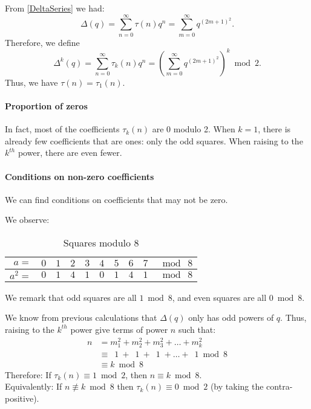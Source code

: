 From \ref{DeltaSeries} we had:
$$
\Delta(q) 
= \sum_{n=0}^{\infty} \tau(n)q^n
= \sum_{m=0}^{\infty} q^{(2m+1)^2}.
$$
Therefore, we define 
$$
\Delta^{k}(q) 
= \sum_{n=0}^{\infty} \tau_k(n)q^n
= \left( \sum_{m=0}^{\infty} q^{(2m+1)^2} \right)^k \bmod 2.
$$
Thus, we have $\tau(n)=\tau_1(n)$.

\paragraph{Proportion of zeros}
In fact, most of the coefficients $\tau_k(n)$ are $0$ modulo 2.
When $k=1$, there is already few coefficients that are ones: only the odd squares.
When raising to the $k^{th}$ power, there are even fewer.

\paragraph{Conditions on non-zero coefficients}
We can find conditions on coefficients that may not be zero.

We observe:
\begin{table}[!ht]

	\begin{center}
		\begin{tabular}{|r||c|c|c|c|c|c|c|c||l|}
			\hline
			$a=$ & $0$ & $1$ & $2$ & $3$ & $4$ & $5$ & $6$ & $7$ & $\bmod \ 8$ \\
			\hline
			$a^2=$ & \color{BrickRed} $0$ & \color{ForestGreen} $1$ & \color{BrickRed} $4$ & \color{ForestGreen} $1$ & \color{BrickRed} $0$ & \color{ForestGreen} $1$ & \color{BrickRed} $4$ & \color{ForestGreen} $1$ & $\bmod \ 8$ \\
			\hline

		\end{tabular}
	\end{center}
	\caption{Squares modulo $8$}
	\label{table:SquaresMod8}
\end{table}
We remark that odd squares are all $1 \bmod 8$, and even squares are all $0 \bmod 8$.

We know from previous calculations that $\Delta(q)$ only has odd powers of $q$.
Thus, raising to the $k^{th}$ power give terms of power $n$ such that:
\begin{align*}
n &= m_1^2 + m_2^2 + m_3^2 + \dots + m_k^2 \\
&\equiv \:\; 1 \ + \:\; 1 \ + \:\; 1 \; + \dots + \:\; 1 \bmod 8 \\
&\equiv k \bmod 8
\end{align*}
Therefore: If $\tau_k(n) \equiv 1 \bmod 2$, then $n \equiv k \bmod 8$.\\
Equivalently: If $n \not\equiv k \bmod 8$ then $\tau_k(n) \equiv 0 \bmod 2$ (by taking the contra-positive).

